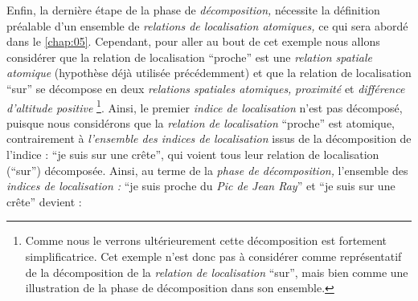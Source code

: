 \begin{quote}
\end{quote}


Enfin, la dernière étape de la phase de \emph{décomposition,}
nécessite la définition préalable d'un ensemble de \emph{relations de
  localisation atomiques,} ce qui sera abordé dans le
\autoref{chap:05}. Cependant, pour aller au bout de cet exemple nous
allons considérer que la relation de localisation \enquote{proche} est
une \emph{relation spatiale atomique} (hypothèse déjà utilisée
précédemment) et que la relation de localisation \enquote{sur} se
décompose en deux \emph{relations spatiales atomiques,}
\emph{proximité} et \emph{différence d'altitude positive}
\footnote{Comme nous le verrons ultérieurement cette décomposition est
  fortement simplificatrice. Cet exemple n'est donc pas à considérer
  comme représentatif de la décomposition de la \emph{relation de
    localisation} \enquote{sur}, mais bien comme une illustration de
  la phase de décomposition dans son ensemble.}. Ainsi, le premier
\emph{indice de localisation} n'est pas décomposé, puisque nous
considérons que la \emph{relation de localisation} \enquote{proche}
est atomique, contrairement à \emph{l'ensemble des indices de
  localisation} issus de la décomposition de l'indice : \enquote{je
  suis sur une crête}, qui voient tous leur relation de localisation
(\enquote{sur}) décomposée. Ainsi, au terme de la \emph{phase de
  décomposition,} l'ensemble des \emph{indices de localisation :}
\enquote{je suis proche du \emph{Pic de Jean Ray}} et \enquote{je suis
  sur une crête} devient :

